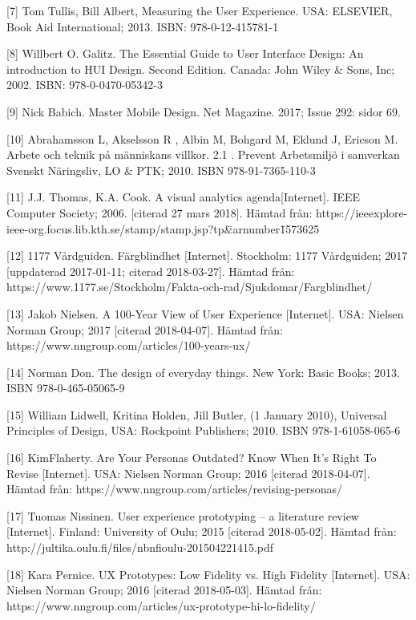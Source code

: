\documentclass[12pt]{kththesis}
\begin{document}
[7] Tom Tullis, Bill Albert, Measuring the User Experience. USA: ELSEVIER, Book Aid International; 2013. ISBN: 978-0-12-415781-1

[8] Willbert O. Galitz. The Essential Guide to User Interface Design: An introduction to HUI Design. Second Edition. Canada: John Wiley \& Sons, Inc; 2002. ISBN: 978-0-0470-05342-3

[9] Nick Babich. Master Mobile Design. Net Magazine. 2017; Issue 292: sidor 69.         

[10] Abrahamsson L, Akselsson R , Albin M,  Bohgard M, Eklund J, Ericson M. Arbete och teknik på människans villkor. 2.1 . Prevent Arbetsmiljö i samverkan Svenskt Näringsliv, LO \& PTK; 2010. ISBN 978-91-7365-110-3

[11] J.J. Thomas, K.A. Cook. A visual analytics agenda[Internet]. IEEE Computer Society; 2006. [citerad 27 mars 2018]. Hämtad från: \newline
https://ieeexplore-ieee-org.focus.lib.kth.se\newline/stamp/stamp.jsp?tp\=\&arnumber\=1573625

[12] 1177 Vårdguiden. Färgblindhet [Internet]. Stockholm: 1177 Vårdguiden; 2017 [uppdaterad 2017-01-11; citerad 2018-03-27]. Hämtad från:\newline 
https://www.1177.se/Stockholm/Fakta-och-rad/Sjukdomar/Fargblindhet/

[13] Jakob Nielsen. A 100-Year View of User Experience [Internet].  USA: Nielsen Norman Group; 2017 [citerad 2018-04-07]. Hämtad från:  https://www.nngroup.com/articles/100-years-ux/

[14] Norman Don. The design of everyday things. New York: Basic Books; 2013. ISBN 978-0-465-05065-9 

[15] William Lidwell, Kritina Holden, Jill Butler, (1 January 2010), Universal Principles of Design, USA: Rockpoint Publishers; 2010. ISBN 978-1-61058-065-6

[16] KimFlaherty. Are Your Personas Outdated? Know When It’s Right To Revise [Internet]. USA: Nielsen Norman Group; 2016 [citerad 2018-04-07]. Hämtad från:  https://www.nngroup.com/articles/revising-personas/ 

[17] Tuomas Nissinen. User experience prototyping – a literature review [Internet]. Finland: University of Oulu; 2015 [citerad 2018-05-02]. Hämtad från: http://jultika.oulu.fi/files/nbnfioulu-201504221415.pdf 

[18] Kara Pernice. UX Prototypes: Low Fidelity vs. High Fidelity [Internet].  USA: Nielsen Norman Group; 2016 [citerad 2018-05-03]. Hämtad från: https://www.nngroup.com/articles/ux-prototype-hi-lo-fidelity/ 
\end{document}
